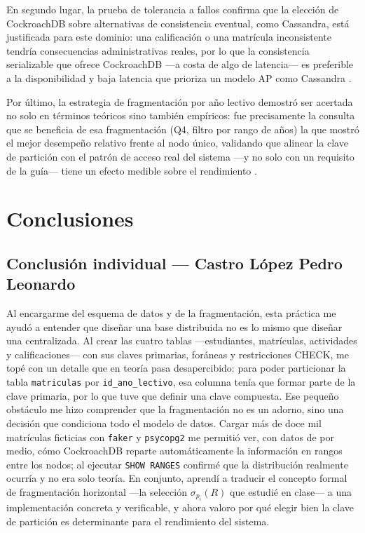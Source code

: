\documentclass[10pt,a4paper]{article}
\begin{document}
En segundo lugar, la prueba de tolerancia a fallos confirma que la
elección de CockroachDB sobre alternativas de consistencia eventual, como
Cassandra, está justificada para este dominio: una calificación o una
matrícula inconsistente tendría consecuencias administrativas reales, por
lo que la consistencia serializable que ofrece CockroachDB —a costa de
algo de latencia— es preferible a la disponibilidad y baja latencia que
prioriza un modelo AP como Cassandra \cite{decandia2007,abadi2012}.
 
Por último, la estrategia de fragmentación por año lectivo demostró ser
acertada no solo en términos teóricos sino también empíricos: fue
precisamente la consulta que se beneficia de esa fragmentación (Q4, filtro
por rango de años) la que mostró el mejor desempeño relativo frente al
nodo único, validando que alinear la clave de partición con el patrón de
acceso real del sistema —y no solo con un requisito de la guía— tiene un
efecto medible sobre el rendimiento \cite{ozsu2020}.


\section{Conclusiones}

\subsection*{Conclusión individual --- Castro López Pedro Leonardo}

Al encargarme del esquema de datos y de la fragmentación, esta práctica me ayudó a
entender que diseñar una base distribuida no es lo mismo que diseñar una centralizada.
Al crear las cuatro tablas ---estudiantes, matrículas, actividades y calificaciones---
con sus claves primarias, foráneas y restricciones CHECK, me topé con un detalle que en
teoría pasa desapercibido: para poder particionar la tabla \texttt{matriculas} por
\texttt{id\_ano\_lectivo}, esa columna tenía que formar parte de la clave primaria, por
lo que tuve que definir una clave compuesta. Ese pequeño obstáculo me hizo comprender que
la fragmentación no es un adorno, sino una decisión que condiciona todo el modelo de
datos. Cargar más de doce mil matrículas ficticias con \texttt{faker} y \texttt{psycopg2}
me permitió ver, con datos de por medio, cómo CockroachDB reparte automáticamente la
información en rangos entre los nodos; al ejecutar \texttt{SHOW RANGES} confirmé que la
distribución realmente ocurría y no era solo teoría. En conjunto, aprendí a traducir el
concepto formal de fragmentación horizontal ---la selección $\sigma_{p_i}(R)$ que estudié
en clase--- a una implementación concreta y verificable, y ahora valoro por qué elegir
bien la clave de partición es determinante para el rendimiento del sistema.
\end{document}
